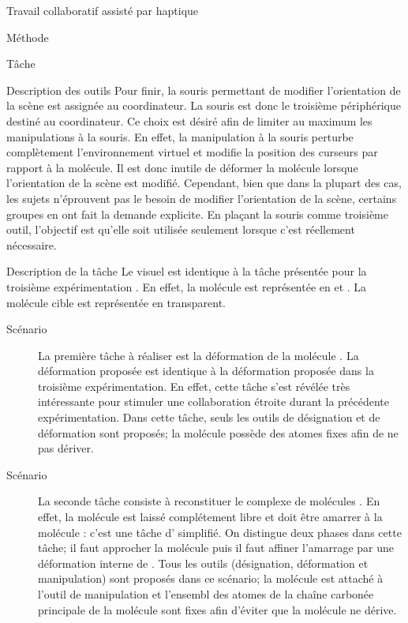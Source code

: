 \documentclass[myfrancais]{mythesis}
\begin{document}
\begin{mychapter}{Travail collaboratif assisté par haptique}
\begin{mysection}{Méthode}
\begin{mysubsection}{Tâche}
\begin{mysubsubsection}{Description des outils}
					Pour finir, la souris permettant de modifier l'orientation de la scène est assignée au coordinateur.
					La souris est donc le troisième périphérique destiné au coordinateur.
					Ce choix est désiré afin de limiter au maximum les manipulations à la souris.
					En effet, la manipulation à la souris perturbe complètement l'environnement virtuel et modifie la position des curseurs par rapport à la molécule.
					Il est donc inutile de déformer la molécule lorsque l'orientation de la scène est modifié.
					Cependant, bien que dans la plupart des cas, les sujets n'éprouvent pas le besoin de modifier l'orientation de la scène, certains groupes en ont fait la demande explicite.
					En plaçant la souris comme troisième outil, l'objectif est qu'elle soit utilisée seulement lorsque c'est réellement nécessaire.
				\end{mysubsubsection}
				\begin{mysubsubsection}{Description de la tâche}
					Le visuel est identique à la tâche présentée pour la troisième expérimentation .
					En effet, la molécule est représentée en \myCPK et \myNewRibbon.
					La molécule cible est représentée en \myNewRibbon transparent.
					\begin{description}
						\item[Scénario~]
							La première tâche à réaliser est la déformation de la molécule \myUbiquitin.
							La déformation proposée est identique à la déformation proposée dans la troisième expérimentation.
							En effet, cette tâche s'est révélée très intéressante pour stimuler une collaboration étroite durant la précédente expérimentation.
							Dans cette tâche, seuls les outils de désignation et de déformation sont proposés; la molécule \myUbiquitin possède des atomes fixes afin de ne pas dériver.
						\item[Scénario~]
							La seconde tâche consiste à reconstituer le complexe de molécules \myNusENusG.
							En effet, la molécule \myNusG est laissé complétement libre et doit être amarrer à la molécule \myNusE : c'est une tâche d' simplifié.
							On distingue deux phases dans cette tâche; il faut approcher la molécule \myNusG puis il faut affiner l'amarrage par une déformation interne de \myNusG.
							Tous les outils (désignation, déformation et manipulation) sont proposés dans ce scénario; la molécule \myNusG est attaché à l'outil de manipulation et l'ensembl des atomes de la chaîne carbonée principale de la molécule \myNusE sont fixes afin d'éviter que la molécule ne dérive.
					\end{description}


\end{mysubsubsection}
\end{mysubsection}
\end{mysection}
\end{mychapter}
\end{document}

